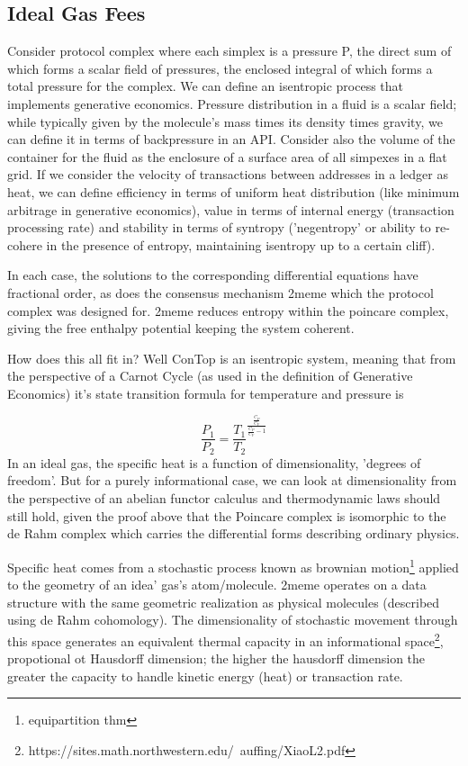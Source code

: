\documentclass{article}
\begin{document}
\subsection{Ideal Gas Fees}
Consider protocol complex where each simplex is a pressure P, the direct sum of which forms a scalar field of pressures, the enclosed integral of which forms a total pressure for the complex. We can define an isentropic process that implements generative economics. Pressure distribution in a fluid is a scalar field; while typically given by the molecule's mass times its density times gravity, we can define it in terms of backpressure in an API. Consider also the volume of the container for the fluid as the enclosure of a surface area of all simpexes in a flat grid. If we consider the velocity of transactions between addresses in a ledger as heat, we can define efficiency in terms of uniform heat distribution (like minimum arbitrage in generative economics), value in terms of internal energy (transaction processing rate) and stability in terms of syntropy ('negentropy' or ability to re-cohere in the presence of entropy, maintaining isentropy up to a certain cliff).

In each case, the solutions to the corresponding differential equations have fractional order, as does the consensus mechanism 2meme which the protocol complex was designed for. 2meme reduces entropy within the poincare complex, giving the free enthalpy potential keeping the system coherent.

How does this all fit in? Well ConTop is an isentropic system, meaning that from the perspective of a Carnot Cycle (as used in the definition of Generative Economics) it's state transition formula for temperature and pressure is 

\begin{equation}
\frac{P_1}{P_2} = \frac{T_1}{T_2}^{\frac{\frac{C_P}{C_V}}{\frac{C_P}{C_V}-1}}
\end{equation}
In an ideal gas, the specific heat is a function of dimensionality, 'degrees of freedom'. But for a purely informational case, we can look at dimensionality from the perspective of an abelian functor calculus and thermodynamic laws should still hold, given the proof above that the Poincare complex is isomorphic to the de Rahm complex which carries the differential forms describing ordinary physics.

Specific heat comes from a stochastic process known as brownian motion\footnote{equipartition thm} applied to the geometry of an idea' gas's atom/molecule. 2meme operates on a data structure with the same geometric realization as physical molecules (described using de Rahm cohomology). The dimensionality of stochastic movement through this space generates an equivalent thermal capacity in an informational space\footnote{https://sites.math.northwestern.edu/~auffing/XiaoL2.pdf}, propotional ot Hausdorff dimension; the higher the hausdorff dimension the greater the capacity to handle kinetic energy (heat) or transaction rate.
\end{document}
